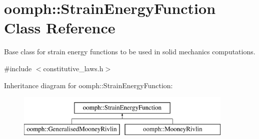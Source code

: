 \hypertarget{classoomph_1_1StrainEnergyFunction}{}\section{oomph\+:\+:Strain\+Energy\+Function Class Reference}
\label{classoomph_1_1StrainEnergyFunction}


Base class for strain energy functions to be used in solid mechanics computations.  




{\ttfamily \#include $<$constitutive\+\_\+laws.\+h$>$}

Inheritance diagram for oomph\+:\+:Strain\+Energy\+Function\+:\begin{figure}[H]
\begin{center}
\leavevmode
\includegraphics[height=2.000000cm]{classoomph_1_1StrainEnergyFunction}
\end{center}
\end{figure}
